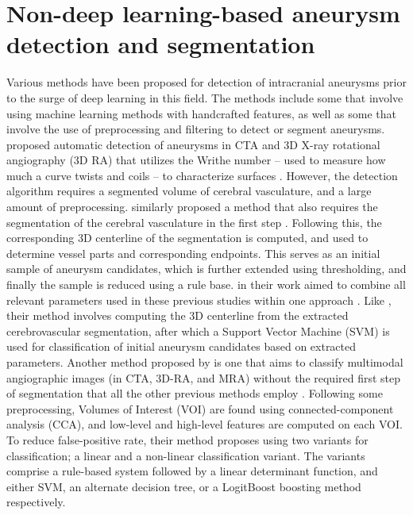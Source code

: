 \section{Non-deep learning-based aneurysm detection and segmentation}
Various methods have been proposed for detection of intracranial aneurysms prior to the surge of deep learning in this field. The methods include some that involve using machine learning methods with handcrafted features, as well as some that involve the use of preprocessing and filtering to detect or segment aneurysms. \citeauthor{Lauric2010} proposed automatic detection of aneurysms in CTA and 3D X-ray rotational angiography (3D RA) that utilizes the Writhe number -- used to measure how much a curve twists and coils -- to characterize surfaces \cite{Lauric2010}. However, the detection algorithm requires a segmented volume of cerebral vasculature, and a large amount of preprocessing. \citeauthor{Yang2011} similarly proposed a method that also requires the segmentation of the cerebral vasculature in the first step \cite{Yang2011}. Following this, the corresponding 3D centerline of the segmentation is computed, and used to determine vessel parts and corresponding endpoints. This serves as an initial sample of aneurysm candidates, which is further extended using thresholding, and finally the sample is reduced using a rule base. \citeauthor{Suniaga2012} in their work aimed to combine all relevant parameters used in these previous studies within one approach \cite{Suniaga2012}. Like \citeauthor{Yang2011}, their method involves computing the 3D centerline from the extracted cerebrovascular segmentation, after which a Support Vector Machine (SVM) is used for classification of initial aneurysm candidates based on extracted parameters. Another method proposed by \citeauthor{Hentschke2014} is one that aims to classify multimodal angiographic images (in CTA, 3D-RA, and MRA) without the required first step of segmentation that all the other previous methods employ \cite{Hentschke2014}. Following some preprocessing, Volumes of Interest (VOI) are found using connected-component analysis (CCA), and low-level and high-level features are computed on each VOI. To reduce false-positive rate, their method proposes using two variants for classification; a linear and a non-linear classification variant. The variants comprise a rule-based system followed by a linear determinant function, and either SVM, an alternate decision tree, or a LogitBoost boosting method respectively. 

